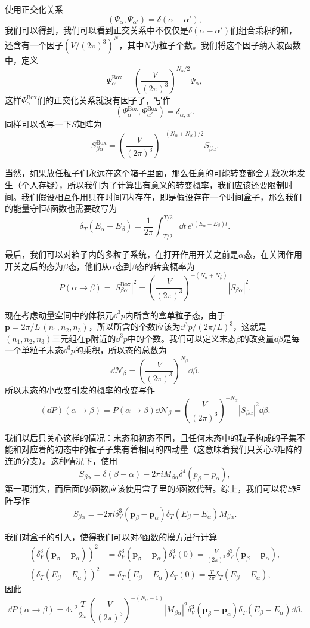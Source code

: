 使用正交化关系
\[
(\Psi_\alpha,\Psi_{\alpha'})=\delta(\alpha-\alpha'),
\]
我们可以得到，我们可以看到正交关系中不仅仅是$\delta(\alpha-\alpha')$们组合乘积的和，还含有一个因子$(V/(2\pi)^3)^N$，其中$N$为粒子个数。我们将这个因子纳入波函数中，定义
\[
	\Psi_\alpha^{\text{Box}}=\left(\frac{V}{(2\pi)^3}\right)^{N_\alpha/2}\Psi_\alpha,
\]
这样$\Psi_\alpha^{\text{Box}}$们的正交化关系就没有因子了，写作
\[
\left(\Psi_\alpha^{\text{Box}},\Psi_{\alpha'}^{\text{Box}}\right)=\delta_{\alpha,\alpha'}.
\]
同样可以改写一下$S$矩阵为
\[
S_{\beta\alpha}^{\text{Box}}=\left(\frac{V}{(2\pi)^3}\right)^{-(N_\alpha+N_\beta)/2}S_{\beta\alpha}.
\]

当然，如果放任粒子们永远在这个箱子里面，那么任意的可能转变都会无数次地发生（个人存疑），所以我们为了计算出有意义的转变概率，我们应该还要限制时间。我们假设相互作用只在时间$T$内存在，即是假设存在一个时间盒子，那么我们的能量守恒$\delta$函数也需要改写为
\[
	\delta_T(E_\alpha-E_\beta)=\frac{1}{2\pi}\int_{-T/2}^{T/2}\dd t \,e^{i(E_\alpha-E_\beta)t}.
\]

最后，我们可以对箱子内的多粒子系统，在打开作用开关之前是$\alpha$态，在关闭作用开关之后的态为$\beta$态，他们从$\alpha$态到$\beta$态的转变概率为
\[
	P(\alpha\to\beta)=\left|S_{\beta\alpha}^{\text{Box}}\right|^2=\left(\frac{V}{(2\pi)^3}\right)^{-(N_\alpha+N_\beta)}\left|S_{\beta\alpha}\right|^2.
\]

现在考虑动量空间中的体积元$\dd^3 p$内所含的盒单粒子态，由于$\bm{p}=2\pi/L\,(n_1,n_2,n_3)$，所以所含的个数应该为$\dd^3 p/(2\pi/L)^3$，这就是$(n_1,n_2,n_3)$三元组在$\bm{p}$附近的$\dd^3 p$中的个数。我们可以定义末态$\beta$的改变量$\dd \beta$是每一个单粒子末态$\dd^3 p$的乘积，所以态的总数为
\[
	\dd \mathcal{N}_\beta=\left(\frac{V}{(2\pi)^3}\right)^{N_\beta}\dd \beta.
\]
所以末态的小改变引发的概率的改变写作
\[
	(\dd P)(\alpha\to\beta)=P(\alpha\to\beta)\dd \mathcal{N}_\beta=\left(\frac{V}{(2\pi)^3}\right)^{-N_\alpha}\left|S_{\beta\alpha}\right|^2\dd \beta.
\]

我们以后只关心这样的情况：末态和初态不同，且任何末态中的粒子构成的子集不能和对应着的初态中的粒子子集有着相同的四动量（这意味着我们只关心$S$矩阵的连通分支）。这种情况下，使用
\[
S_{\beta\alpha}=\delta(\beta-\alpha)-2\pi iM_{\beta\alpha}\delta^4(p_\beta-p_\alpha),
\]
第一项消失，而后面的$\delta$函数应该使用盒子里的$\delta$函数代替。综上，我们可以将$S$矩阵写作
\[
S_{\beta\alpha}=-2\pi i \delta^3_V(\bm{p}_\beta-\bm{p}_\alpha)\delta_T(E_\beta-E_\alpha)M_{\beta\alpha}.
\]

我们对盒子的引入，使得我们可以对$\delta$函数的模方进行计算
\[
	\begin{split}
	\left(\delta^3_V(\bm{p}_\beta-\bm{p}_\alpha)\right)^2&=\delta^3_V(\bm{p}_\beta-\bm{p}_\alpha)\delta^3_V(0)=\frac{V}{(2\pi)^3}\delta^3_V(\bm{p}_\beta-\bm{p}_\alpha),\\
	\left(\delta_T(E_\beta-E_\alpha)\right)^2&=\delta_T(E_\beta-E_\alpha)\delta_T(0)=\frac{T}{2\pi}\delta_T(E_\beta-E_\alpha),
	\end{split}
\]
因此
\[
	\dd P(\alpha\to\beta)=4\pi^2\frac{T}{2\pi}\left(\frac{V}{(2\pi)^3}\right)^{-(N_\alpha-1)}\left|M_{\beta\alpha}\right|^2\delta^3_V(\bm{p}_\beta-\bm{p}_\alpha)\delta_T(E_\beta-E_\alpha)\dd \beta.
\]


